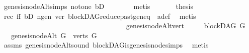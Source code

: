 \begin{isabellebody}
\ genesis{\isacharunderscore}{\kern0pt}nodeAlt{\isachardot}{\kern0pt}simps\ not{\isacharunderscore}{\kern0pt}one\ bD\isanewline
\ \ \ \ \ \ \isamarkupfalse%
\ metis\ \isanewline
\ \ \ \ \isamarkupfalse%
\ {\isacharquery}{\kern0pt}thesis\ \isamarkupfalse%
\ rec\ ff\ bD\ n{\isacharunderscore}{\kern0pt}gen\ ver\ blockDAG{\isachardot}{\kern0pt}reduce{\isacharunderscore}{\kern0pt}past{\isacharunderscore}{\kern0pt}gen{\isacharunderscore}{\kern0pt}eq\ \ a{\isacharunderscore}{\kern0pt}def\ \isamarkupfalse%
\ metis\isanewline
\ \ \isamarkupfalse%
\isanewline
{}\isamarkupfalse%
%
\endisatagproof
{\isafoldproof}%
%
\isadelimproof
\ \ \ \ \ \ \ \ \ \ \ \ \ \ \ \ \ \ \ \ \ \ \ \ \ \ \ \ \ \ \ \ \ \ \isanewline
%
\endisadelimproof
\isanewline
{}\isamarkupfalse%
\ genesis{\isacharunderscore}{\kern0pt}nodeAlt{\isacharunderscore}{\kern0pt}vert\ {\isacharcolon}{\kern0pt}\ \isanewline
\ \ \ {\isachardoublequoteopen}blockDAG\ G{\isachardoublequoteclose}\isanewline
\ \ \ {\isachardoublequoteopen}{\isacharparenleft}{\kern0pt}genesis{\isacharunderscore}{\kern0pt}nodeAlt\ G{\isacharparenright}{\kern0pt}\ {\isasymin}\ verts\ G{\isachardoublequoteclose}\ \isanewline
%
\isadelimproof
\ \ %
\endisadelimproof
%
\isatagproof
{}\isamarkupfalse%
\ assms\ genesis{\isacharunderscore}{\kern0pt}nodeAlt{\isacharunderscore}{\kern0pt}sound\ blockDAG{\isachardot}{\kern0pt}is{\isacharunderscore}{\kern0pt}genesis{\isacharunderscore}{\kern0pt}node{\isachardot}{\kern0pt}simps\ \isamarkupfalse%
\ metis%
\endisatagproof
{\isafoldproof}%
%
\isadelimproof
\isanewline
%
\endisadelimproof
\isanewline
%
\isadelimtheory
\isanewline
%
\endisadelimtheory
%
\isatagtheory
{}\isamarkupfalse%
%
\endisatagtheory
{\isafoldtheory}%
%
\isadelimtheory
%
\endisadelimtheory
%
\end{isabellebody}%
\endinput
